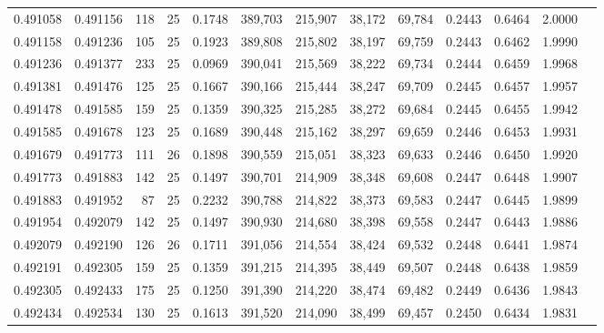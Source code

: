 \begin{tabular}{rrrrrrrrrrrrr}
0.491058 & 0.491156 &   118 &  25 &                                     0.1748 & 389,703 & 215,907 &  38,172 &  69,784 & 0.2443 & 0.6464 & 2.0000 \\
0.491158 & 0.491236 &   105 &  25 &                                     0.1923 & 389,808 & 215,802 &  38,197 &  69,759 & 0.2443 & 0.6462 & 1.9990 \\
0.491236 & 0.491377 &   233 &  25 &                                     0.0969 & 390,041 & 215,569 &  38,222 &  69,734 & 0.2444 & 0.6459 & 1.9968 \\
0.491381 & 0.491476 &   125 &  25 &                                     0.1667 & 390,166 & 215,444 &  38,247 &  69,709 & 0.2445 & 0.6457 & 1.9957 \\
0.491478 & 0.491585 &   159 &  25 &                                     0.1359 & 390,325 & 215,285 &  38,272 &  69,684 & 0.2445 & 0.6455 & 1.9942 \\
0.491585 & 0.491678 &   123 &  25 &                                     0.1689 & 390,448 & 215,162 &  38,297 &  69,659 & 0.2446 & 0.6453 & 1.9931 \\
0.491679 & 0.491773 &   111 &  26 &                                     0.1898 & 390,559 & 215,051 &  38,323 &  69,633 & 0.2446 & 0.6450 & 1.9920 \\
0.491773 & 0.491883 &   142 &  25 &                                     0.1497 & 390,701 & 214,909 &  38,348 &  69,608 & 0.2447 & 0.6448 & 1.9907 \\
0.491883 & 0.491952 &    87 &  25 &                                     0.2232 & 390,788 & 214,822 &  38,373 &  69,583 & 0.2447 & 0.6445 & 1.9899 \\
0.491954 & 0.492079 &   142 &  25 &                                     0.1497 & 390,930 & 214,680 &  38,398 &  69,558 & 0.2447 & 0.6443 & 1.9886 \\
0.492079 & 0.492190 &   126 &  26 &                                     0.1711 & 391,056 & 214,554 &  38,424 &  69,532 & 0.2448 & 0.6441 & 1.9874 \\
0.492191 & 0.492305 &   159 &  25 &                                     0.1359 & 391,215 & 214,395 &  38,449 &  69,507 & 0.2448 & 0.6438 & 1.9859 \\
0.492305 & 0.492433 &   175 &  25 &                                     0.1250 & 391,390 & 214,220 &  38,474 &  69,482 & 0.2449 & 0.6436 & 1.9843 \\
0.492434 & 0.492534 &   130 &  25 &                                     0.1613 & 391,520 & 214,090 &  38,499 &  69,457 & 0.2450 & 0.6434 & 1.9831 \\

\end{tabular}
